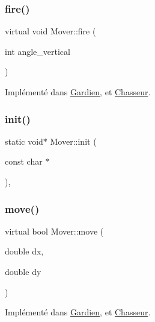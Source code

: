 \subsubsection{\texorpdfstring{fire()}{fire()}}
{\footnotesize\ttfamily virtual void Mover\+::fire (\begin{DoxyParamCaption}\item[{int}]{angle\+\_\+vertical }\end{DoxyParamCaption})\hspace{0.3cm}{\ttfamily [pure virtual]}}



Implémenté dans \hyperlink{classGardien_aa0e2e0fbdca75ddc5e0501b5498d5f55}{Gardien}, et \hyperlink{classChasseur_ae4610a58bb02ee492e8bdfbee917db8a}{Chasseur}.

\mbox{\label{classMover_a838ebd14a8a3f2a561ac3df0841f7a29}} 
\subsubsection{\texorpdfstring{init()}{init()}}
{\footnotesize\ttfamily static void$\ast$ Mover\+::init (\begin{DoxyParamCaption}\item[{const char $\ast$}]{ }\end{DoxyParamCaption})\hspace{0.3cm}{\ttfamily [static]}, {\ttfamily [private]}}

\mbox{\label{classMover_a2e1858e5c93ddaa85ff7b446ad403b79}} 
\subsubsection{\texorpdfstring{move()}{move()}}
{\footnotesize\ttfamily virtual bool Mover\+::move (\begin{DoxyParamCaption}\item[{double}]{dx,  }\item[{double}]{dy }\end{DoxyParamCaption})\hspace{0.3cm}{\ttfamily [pure virtual]}}



Implémenté dans \hyperlink{classGardien_a1de6511bda736ad456457c51fa9d8d68}{Gardien}, et \hyperlink{classChasseur_ac5275e34388084bc3ca2114b45a0b725}{Chasseur}.

